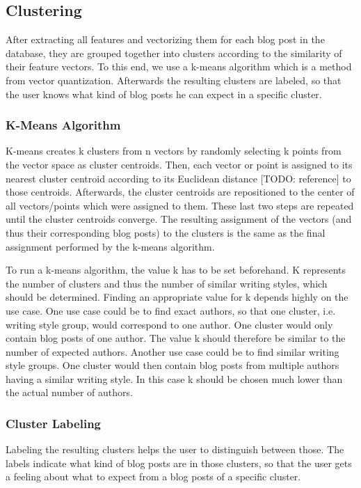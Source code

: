 
\subsection{Clustering}
\label{sec:clustering}

After extracting all features and vectorizing them for each blog post in the database, they are grouped together into clusters according to the similarity of their feature vectors.
To this end, we use a k-means algorithm which is a method from vector quantization.
Afterwards the resulting clusters are labeled, so that the user knows what kind of blog posts he can expect in a specific cluster.

\subsubsection{K-Means Algorithm}
\label{sec:k-means}
K-means creates k clusters from n vectors by randomly selecting k points from the vector space as cluster centroids.
Then, each vector or point is assigned to its nearest cluster centroid according to its Euclidean distance [TODO: reference] to those centroids.
Afterwards, the cluster centroids are repositioned to the center of all vectors/points which were assigned to them.
These last two steps are repeated until the cluster centroids converge.
The resulting assignment of the vectors (and thus their corresponding blog posts) to the clusters is the same as the final assignment performed by the k-means algorithm.

To run a k-means algorithm, the value k has to be set beforehand.
K represents the number of clusters and thus the number of similar writing styles, which should be determined.
Finding an appropriate value for k depends highly on the use case.
One use case could be to find exact authors, so that one cluster, i.e. writing style group, would correspond to one author.
One cluster would only contain blog posts of one author.
The value k should therefore be similar to the number of expected authors.
Another use case could be to find similar writing style groups.
One cluster would then contain blog posts from multiple authors having a similar writing style.
In this case k should be chosen much lower than the actual number of authors.


\subsubsection{Cluster Labeling}
\label{sec:cluster_labeling}
Labeling the resulting clusters helps the user to distinguish between those.
The labels indicate what kind of blog posts are in those clusters, so that the user gets a feeling about what to expect from a blog posts of a specific cluster.

